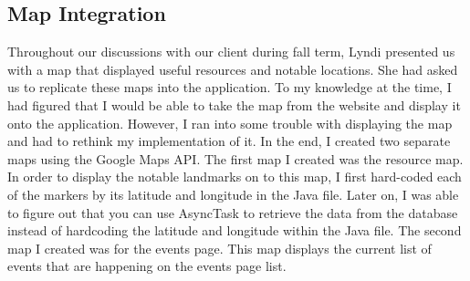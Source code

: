 \documentclass[draftclsnofoot, onecolumn, 10pt, compsoc]{IEEEtran}
\begin{document}
      \subsection{Map Integration}
         Throughout our discussions with our client during fall term, Lyndi presented us with a map that displayed useful resources and notable locations. She had asked us to replicate these maps into the application. To my knowledge at the time, I had figured that I would be able to take the map from the website and display it onto the application. However, I ran into some trouble with displaying the map and had to rethink my implementation of it. In the end, I created two separate maps using the Google Maps API. The first map I created was the resource map. In order to display the notable landmarks on to this map, I first hard-coded each of the markers by its latitude and longitude in the Java file. Later on, I was able to figure out that you can use AsyncTask to retrieve the data from the database instead of hardcoding the latitude and longitude within the Java file. The second map I created was for the events page. This map displays the current list of events that are happening on the events page list.
\end{document}
